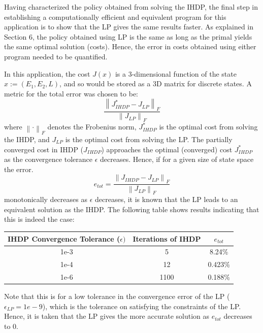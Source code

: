 \documentclass[conference]{IEEEtran}
\newcommand{\norm}[1]{\left\lVert#1\right\rVert}
\begin{document}
Having characterized the policy obtained from solving the IHDP, the final step in establishing a computationally efficient and equivalent program for this application is to show that the LP gives the same results faster. As explained in Section 6, the policy obtained using LP is the same as long as the primal yields the same optimal solution (costs). Hence, the error in costs obtained using either program needed to be quantified.

In this application, the cost $J(x)$ is a 3-dimensional function of the state $x:=(E_{1},E_{2},L)$, and so would be stored as a 3D matrix for discrete states. A metric for the total error was chosen to be:
\begin{displaymath}
    \frac{\norm{J^{*}_{IHDP}-J_{LP}}_{F}}{\norm{J_{LP}}_{F}}
\end{displaymath} where $\norm{\cdot}_{F}$ denotes the Frobenius norm, $J^{*}_{IHDP}$ is the optimal cost from solving the IHDP, and $J_{LP}$ is the optimal cost from solving the LP. The partially converged cost in IHDP ($J_{IHDP}$) approaches the optimal (converged) cost $J^{*}_{IHDP}$ as the convergence tolerance $\epsilon$ decreases. Hence, if for a given size of state space the error.
\begin{displaymath}
    e_{tot}=\frac{\norm{J_{IHDP}-J_{LP}}_{F}}{\norm{J_{LP}}_{F}}
\end{displaymath} monotonically decreases as $\epsilon$ decreases, it is known that the LP leads to an equivalent solution as the IHDP. The following table shows results indicating that this is indeed the case:
\begin{table}[htbp]
	\begin{center}
		\begin{tabular}{|c|c|c|}
			\hline
			\textbf{IHDP Convergence Tolerance ($\epsilon)$}&\textbf{Iterations of IHDP}&\textbf{$e_{tot}$} \\
			\hline
			1e-3& 5 & 8.24\% \\
			\hline
			1e-4& 12 & 0.423\% \\
			\hline
			1e-6& 1100 & 0.188\% \\
			\hline
		\end{tabular}
		\label{tab1}
	\end{center}
\end{table} Note that this is for a low tolerance in the convergence error of the LP ($\epsilon_{LP}=1e-9$), which is the tolerance on satisfying the constraints of the LP. Hence, it is taken that the LP gives the more accurate solution as $e_{tot}$ decreases to 0.
\end{document}
